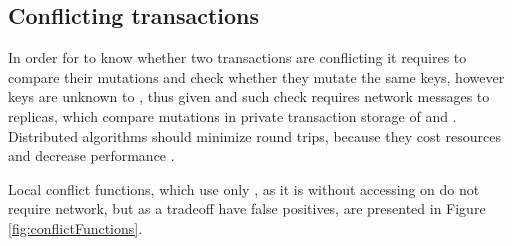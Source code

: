 
\subsection{Conflicting transactions}\label{sec:impl:conflictFunctions}
In order for  to know whether two transactions are conflicting it requires to compare their mutations and check whether they mutate the same keys, however keys are unknown to \txItems, thus
given \txStateOne and \txStateTwo such check requires network messages to replicas, which compare mutations in private transaction storage of \txStateOne and \txStateTwo. 
Distributed algorithms should minimize round trips, because they cost resources and decrease performance \cite{rotem2006fallacies}.

Local conflict functions, which use only \txState, as it is without accessing \mutations on \nodesTx do not require network, but as a tradeoff have false positives, are presented in Figure \ref{fig:conflictFunctions}. 



